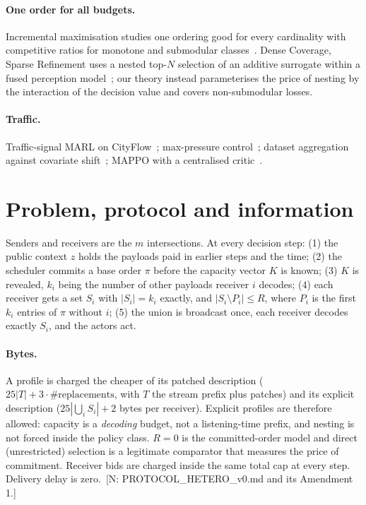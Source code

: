 \documentclass[11pt]{article}
\theoremstyle{definition}
\newif\ifshownotes\shownotestrue
\newcommand{\NOTE}[1]{\ifshownotes{\color{notecol}\,\textsf{\footnotesize[N: #1]}}\fi}
\begin{document}
\paragraph{One order for all budgets.} Incremental maximisation studies one ordering good for every
cardinality with competitive ratios for monotone and submodular classes~\cite{bernstein2022,bienkowski2026}.
Dense Coverage, Sparse Refinement uses a nested top-$N$ selection of an additive surrogate within a
fused perception model~\cite{densecoverage}; our theory instead parameterises the price of nesting by
the interaction of the decision value and covers non-submodular losses.
\paragraph{Traffic.} Traffic-signal MARL on CityFlow~\cite{cityflow,colight}; max-pressure
control~\cite{varaiya2013}; dataset aggregation against covariate shift~\cite{dagger}; MAPPO with a
centralised critic~\cite{mappo}.

\section{Problem, protocol and information}\label{sec:protocol}
Senders and receivers are the $m$ intersections. At every decision step:
(1) the public context $z$ holds the payloads paid in earlier steps and the time;
(2) the scheduler commits a base order $\pi$ before the capacity vector $K$ is known;
(3) $K$ is revealed, $k_i$ being the number of other payloads receiver $i$ decodes;
(4) each receiver gets a set $S_i$ with $|S_i|=k_i$ exactly, and $|S_i\setminus P_i|\le R$, where $P_i$ is
the first $k_i$ entries of $\pi$ without $i$;
(5) the union is broadcast once, each receiver decodes exactly $S_i$, and the actors act.

\paragraph{Bytes.} A profile is charged the cheaper of its patched description
($25|T| + 3\cdot\#\text{replacements}$, with $T$ the stream prefix plus patches) and its explicit
description ($25|\bigcup_i S_i| + 2$ bytes per receiver). Explicit profiles are therefore allowed:
capacity is a \emph{decoding} budget, not a listening-time prefix, and nesting is not forced
inside the policy class. $R=0$ is the committed-order model and direct (unrestricted) selection is
a legitimate comparator that measures the price of commitment. Receiver bids are charged inside
the same total cap at every step. Delivery delay is zero.
\NOTE{PROTOCOL\_HETERO\_v0.md and its Amendment 1.}
\end{document}
